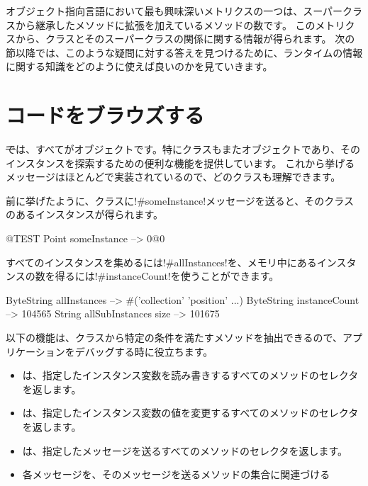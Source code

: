 \documentclass[a4paper,10pt,twoside]{book}
\begin{document}
オブジェクト指向言語において最も興味深いメトリクスの一つは、スーパークラスから継承したメソッドに拡張を加えているメソッドの数です。
このメトリクスから、クラスとそのスーパークラスの関係に関する情報が得られます。
次の節以降では、このような疑問に対する答えを見つけるために、ランタイムの情報に関する知識をどのように使えば良いのかを見ていきます。

\section{コードをブラウズする}

\st では、すべてがオブジェクトです。特にクラスもまたオブジェクトであり、そのインスタンスを探索するための便利な機能を提供しています。
これから挙げるメッセージはほとんどで実装されているので、どのクラスも理解できます。

前に挙げたように、クラスに\ct!#someInstance!メッセージを送ると、そのクラスのあるインスタンスが得られます。
\begin{code}{@TEST} %
Point someInstance --> 0@0
\end{code}

すべてのインスタンスを集めるには\ct!#allInstances!を、メモリ中にあるインスタンスの数を得るには\ct!#instanceCount!を使うことができます。

\begin{code}{} %
ByteString allInstances        --> #('collection' 'position'  ...)
ByteString instanceCount    --> 104565
String allSubInstances size -->  101675
\end{code}

以下の機能は、クラスから特定の条件を満たすメソッドを抽出できるので、アプリケーションをデバッグする時に役立ちます。
\begin{itemize}
\item {} は、指定したインスタンス変数を読み書きするすべてのメソッドのセレクタを返します。
\item {} は、指定したインスタンス変数の値を変更するすべてのメソッドのセレクタを返します。
\item {} は、指定したメッセージを送るすべてのメソッドのセレクタを返します。
\item {} 各メッセージを、そのメッセージを送るメソッドの集合に関連づける %
\end{itemize}
\end{document}
